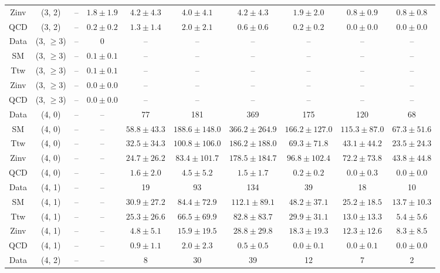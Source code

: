 \begin{table}[h!]
{\begin{tabular}{cccccccccc}
	Zinv & (3, 2) & -- & $1.8\pm 1.9$ & $4.2\pm 4.3$ & $4.0\pm 4.1$ & $4.2\pm 4.3$ & $1.9\pm 2.0$ & $0.8\pm 0.9$ & $0.8\pm 0.8$ \\[0.5ex] 
	QCD & (3, 2) & -- & $0.2\pm 0.2$ & $1.3\pm 1.4$ & $2.0\pm 2.1$ & $0.6\pm 0.6$ & $0.2\pm 0.2$ & $0.0\pm 0.0$ & $0.0\pm 0.0$ \\[0.5ex] 
	Data & (3, $\ge3$) & -- & 0 & -- & -- & -- & -- & -- & -- \\[0.5ex] 
	SM & (3, $\ge3$) & -- & $0.1\pm 0.1$ & -- & -- & -- & -- & -- & -- \\[0.5ex] 
	Ttw & (3, $\ge3$) & -- & $0.1\pm 0.1$ & -- & -- & -- & -- & -- & -- \\[0.5ex] 
	Zinv & (3, $\ge3$) & -- & $0.0\pm 0.0$ & -- & -- & -- & -- & -- & -- \\[0.5ex] 
	QCD & (3, $\ge3$) & -- & $0.0\pm 0.0$ & -- & -- & -- & -- & -- & -- \\[0.5ex] 
	Data & (4, 0) & -- & -- & 77 & 181 & 369 & 175 & 120 & 68 \\[0.5ex] 
	SM & (4, 0) & -- & -- & $58.8\pm 43.3$ & $188.6\pm 148.0$ & $366.2\pm 264.9$ & $166.2\pm 127.0$ & $115.3\pm 87.0$ & $67.3\pm 51.6$ \\[0.5ex] 
	Ttw & (4, 0) & -- & -- & $32.5\pm 34.3$ & $100.8\pm 106.0$ & $186.2\pm 188.0$ & $69.3\pm 71.8$ & $43.1\pm 44.2$ & $23.5\pm 24.3$ \\[0.5ex] 
	Zinv & (4, 0) & -- & -- & $24.7\pm 26.2$ & $83.4\pm 101.7$ & $178.5\pm 184.7$ & $96.8\pm 102.4$ & $72.2\pm 73.8$ & $43.8\pm 44.8$ \\[0.5ex] 
	QCD & (4, 0) & -- & -- & $1.6\pm 2.0$ & $4.5\pm 5.2$ & $1.5\pm 1.7$ & $0.2\pm 0.2$ & $0.0\pm 0.3$ & $0.0\pm 0.0$ \\[0.5ex] 
	Data & (4, 1) & -- & -- & 19 & 93 & 134 & 39 & 18 & 10 \\[0.5ex] 
	SM & (4, 1) & -- & -- & $30.9\pm 27.2$ & $84.4\pm 72.9$ & $112.1\pm 89.1$ & $48.2\pm 37.1$ & $25.2\pm 18.5$ & $13.7\pm 10.3$ \\[0.5ex] 
	Ttw & (4, 1) & -- & -- & $25.3\pm 26.6$ & $66.5\pm 69.9$ & $82.8\pm 83.7$ & $29.9\pm 31.1$ & $13.0\pm 13.3$ & $5.4\pm 5.6$ \\[0.5ex] 
	Zinv & (4, 1) & -- & -- & $4.8\pm 5.1$ & $15.9\pm 19.5$ & $28.8\pm 29.8$ & $18.3\pm 19.3$ & $12.3\pm 12.6$ & $8.3\pm 8.5$ \\[0.5ex] 
	QCD & (4, 1) & -- & -- & $0.9\pm 1.1$ & $2.0\pm 2.3$ & $0.5\pm 0.5$ & $0.0\pm 0.1$ & $0.0\pm 0.1$ & $0.0\pm 0.0$ \\[0.5ex] 
	Data & (4, 2) & -- & -- & 8 & 30 & 39 & 12 & 7 & 2 \\[0.5ex] 

\end{tabular}}
\end{table}
